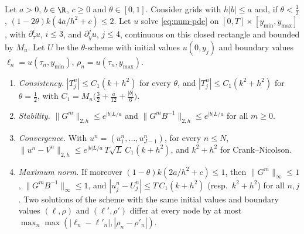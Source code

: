 \begin{theorem}\label{thm:num-schemes}
Let $a>0$, $b\in\R$, $c\ge0$ and $\theta\in[0,1]$. Consider grids with $h|b|\le a$ and, if
$\theta<\frac12$, $(1-2\theta)k(4a/h^2+c)\le2$. Let $u$ solve \eqref{eq:num-pde} on
$[0,T]\times[y_{\min},y_{\max}]$, with $\partial^i_\tau u$, $i\le3$, and $\partial^j_yu$, $j\le4$, continuous on this
closed rectangle and bounded by $M_u$. Let $U$ be the $\theta$-scheme with initial values $u(0,y_j)$
and boundary values $\ell_n=u(\tau_n,y_{\min})$, $\rho_n=u(\tau_n,y_{\max})$.
\begin{enumerate}[label=(\roman*)]
  \item \emph{Consistency.} $|T^n_j|\le C_1(k+h^2)$ for every $\theta$, and $|T^n_j|\le C_1(k^2+h^2)$
    for $\theta=\frac12$, with $C_1=M_u\big(\frac32+\frac a{12}+\frac{|b|}6\big)$.
  \item \emph{Stability.} $\|G^m\|_{2,h}\le e^{|b|L/a}$ and $\|G^mB^{-1}\|_{2,h}\le e^{|b|L/a}$ for all
    $m\ge0$.
  \item \emph{Convergence.} With $u^n=(u^n_1,\dots,u^n_{J-1})$, for every $n\le N$,
    $\|u^n-V^n\|_{2,h}\le e^{|b|L/a}\,T\sqrt L\,C_1(k+h^2)$, and $k^2+h^2$ for Crank--Nicolson.
  \item \emph{Maximum norm.} If moreover $(1-\theta)k(2a/h^2+c)\le1$, then $\|G^m\|_\infty\le1$,
    $\|G^mB^{-1}\|_\infty\le1$, and $|u^n_j-U^n_j|\le T\,C_1(k+h^2)$ (resp.\ $k^2+h^2$) for all $n,j$.
    Two solutions of the scheme with the same initial values and boundary values $(\ell,\rho)$ and
    $(\ell',\rho')$ differ at every node by at most $\max_n\max(|\ell_n-\ell'_n|,|\rho_n-\rho'_n|)$.
\end{enumerate}
\end{theorem}

